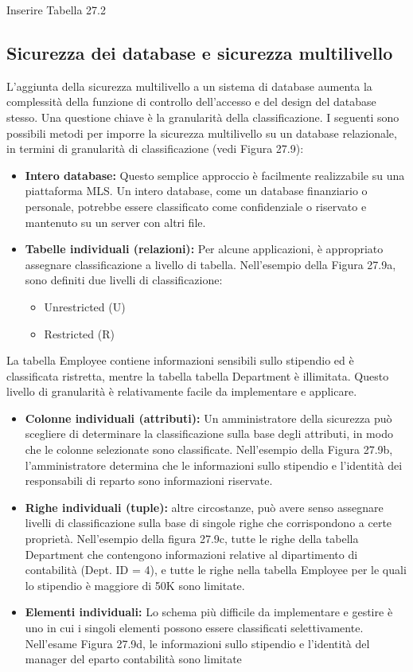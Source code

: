 Inserire Tabella 27.2

\subsection{Sicurezza dei database e sicurezza multilivello}
L'aggiunta della sicurezza multilivello a un sistema di database aumenta la complessità della funzione di controllo dell'accesso e del design del database stesso. Una questione chiave è la granularità della classificazione. I seguenti sono possibili metodi per imporre la sicurezza multilivello su un database relazionale, in termini di granularità di classificazione (vedi Figura 27.9):
\begin{itemize}
    \item \textbf{Intero database:} Questo semplice approccio è facilmente realizzabile su una piattaforma MLS. Un intero database, come un database finanziario o personale, potrebbe essere classificato come confidenziale o riservato e mantenuto su un server con altri file.
    
    \item \textbf{Tabelle individuali (relazioni):} Per alcune applicazioni, è appropriato assegnare classificazione a livello di tabella. Nell'esempio della Figura 27.9a, sono definiti due livelli di classificazione:
    \begin{itemize}
        \item Unrestricted (U)
        \item Restricted (R)
    \end{itemize}
\end{itemize}
La tabella Employee contiene informazioni sensibili sullo stipendio ed è classificata ristretta, mentre la tabella tabella Department è illimitata. Questo livello di granularità è relativamente facile da implementare e applicare.
\begin{itemize}
    \item \textbf{Colonne individuali (attributi):} Un amministratore della sicurezza può scegliere di determinare la classificazione sulla base degli attributi, in modo che le colonne selezionate sono classificate. Nell'esempio della Figura 27.9b, l'amministratore determina che le informazioni sullo stipendio e l'identità dei responsabili di reparto sono informazioni riservate.
    
    \item \textbf{Righe individuali (tuple):} altre circostanze, può avere senso assegnare livelli di classificazione sulla base di singole righe che corrispondono a certe proprietà. Nell'esempio della figura 27.9c, tutte le righe della tabella Department che contengono informazioni relative al dipartimento di contabilità (Dept. ID = 4), e tutte le righe nella tabella Employee per le quali lo stipendio è maggiore di 50K sono limitate.
    
    \item \textbf{Elementi individuali:} Lo schema più difficile da implementare e gestire è uno in cui i singoli elementi possono essere classificati selettivamente. Nell'esame Figura 27.9d, le informazioni sullo stipendio e l'identità del manager del eparto contabilità sono limitate
\end{itemize}
